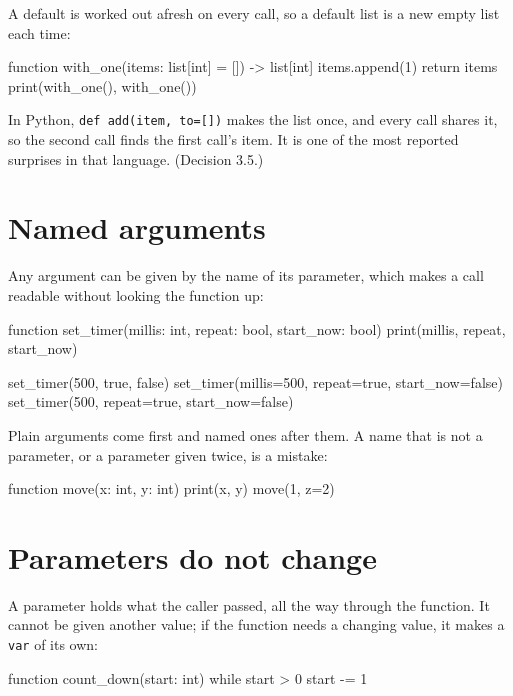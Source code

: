 A default is worked out afresh on every call, so a default list is a
new empty list each time:

\begin{zeno}
function with_one(items: list[int] = []) -> list[int] {
    items.append(1)
    return items
}
print(with_one(), with_one())
\end{zeno}

\begin{why}
In Python, \verb|def add(item, to=[])| makes the list once, and every
call shares it, so the second call finds the first call's item. It is
one of the most reported surprises in that language. (Decision 3.5.)
\end{why}

\section{Named arguments}

Any argument can be given by the name of its parameter, which makes a
call readable without looking the function up:

\begin{zeno}
function set_timer(millis: int, repeat: bool, start_now: bool) {
    print(millis, repeat, start_now)
}

set_timer(500, true, false)
set_timer(millis=500, repeat=true, start_now=false)
set_timer(500, repeat=true, start_now=false)
\end{zeno}

Plain arguments come first and named ones after them. A name that is
not a parameter, or a parameter given twice, is a mistake:

\begin{zeno}[fails=yes]
function move(x: int, y: int) {
    print(x, y)
}
move(1, z=2)
\end{zeno}

\section{Parameters do not change}

A parameter holds what the caller passed, all the way through the
function. It cannot be given another value; if the function needs a
changing value, it makes a \verb|var| of its own:

\begin{zeno}[fails=yes]
function count_down(start: int) {
    while start > 0 {
        start -= 1
    }
}
\end{zeno}

